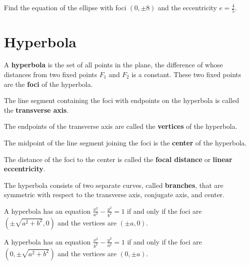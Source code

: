 \begin{example}
    Find the equation of the ellipse with foci $(0, \pm8)$ and the eccentricity $e=\frac45$.
\end{example}
\vspace*{8\baselineskip}

\section{Hyperbola}

\begin{definition}
A \textbf{hyperbola} is the set of all points in the plane, the difference of whose distances
from two fixed points $F_1$ and $F_2$ is a constant. These two
fixed points are the \textbf{foci} of the hyperbola.
\end{definition}

\begin{definition}
The line segment containing the foci with endpoints on the hyperbola is called the \textbf{transverse axis}. 

The endpoints of the transverse axis are called the \textbf{vertices} of the hyperbola.

The midpoint of the line segment joining the foci is the \textbf{center} of the hyperbola.

The distance of the foci to the center is called the \textbf{focal distance} or \textbf{linear eccentricity}.

The hyperbola consists of two separate curves, called \textbf{branches}, that are symmetric with respect to the transverse axis, conjugate
axis, and center. \end{definition}


\begin{theorem}
    A hyperbola has an equation $\frac{x^2}{a^2}-\frac{y^2}{b^2}=1$ if and only if the foci are $(\pm \sqrt{a^2+b^2}, 0)$ and the vertices are $(\pm a, 0)$.
\end{theorem}

\begin{theorem}
    A hyperbola has an equation $\frac{x^2}{b^2}-\frac{y^2}{a^2}=1$ if and only if the foci are $(0, \pm \sqrt{a^2+b^2})$ and the vertices are $(0, \pm a)$.
\end{theorem}

